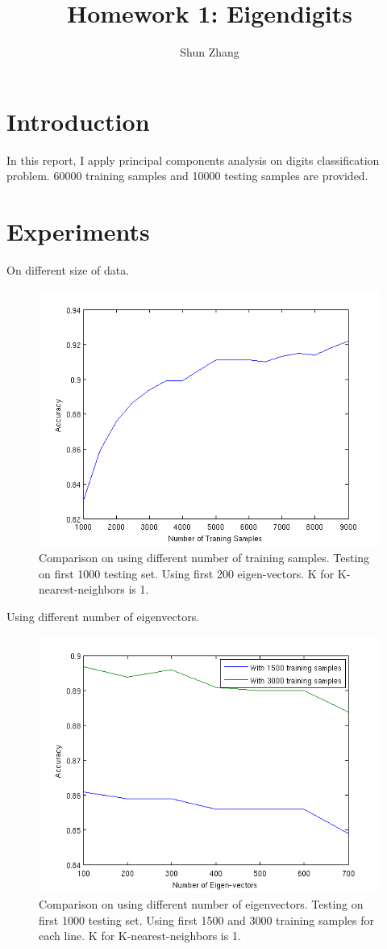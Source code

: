 \documentclass[10pt]{article}
\title{Homework 1: Eigendigits}
\author{Shun Zhang}
\date{}
\begin{document}
\maketitle

\section{Introduction}

In this report, I apply principal components analysis on digits
classification problem. 60000 training samples and 10000 testing
samples are provided.

\section{Experiments}

On different size of data.

\begin{figure}[b]
\centering
\includegraphics[width=0.8\columnwidth]{diffDataSet.png}
\caption{Comparison on using different number of training samples.
Testing on first 1000 testing set. Using first 200 eigen-vectors. K
for K-nearest-neighbors is 1.}
\label{fig:dataset}
\end{figure}

Using different number of eigenvectors.

\begin{figure}[b]
\centering
\includegraphics[width=0.8\columnwidth]{diffEVector.png}
\caption{Comparison on using different number of eigenvectors.
Testing on first 1000 testing set. Using first 1500 and 3000 training
samples for each line.  K for K-nearest-neighbors is 1.}
\label{fig:evec}
\end{figure}
\end{document}
